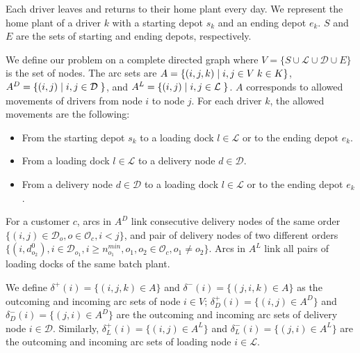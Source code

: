 Each driver leaves and returns to their home plant every day. We represent the home plant of a driver $k$ with a starting depot $s_k$ and an ending depot $e_k$. $S$ and $E$ are the sets of starting and ending depots, respectively.

We define our problem on a complete directed graph where $V=\{ S \cup \mathcal{L} \cup \mathcal{D} \cup E\}$ is the set of nodes. The arc sets are $A =  \{(i,j,k) \hspace*{1mm} \vert \hspace*{1mm} i, j \in V \hspace{1mm} k\in K \}$, $A^D = \{(i,j) \hspace*{1mm} \vert \hspace*{1mm} i, j \in \mathcal{D} \hspace{1mm} \}$, and $A^L = \{(i,j) \hspace*{1mm} \vert \hspace*{1mm} i, j \in \mathcal{L} \hspace{1mm} \}$.
$A$ corresponds to allowed movements of drivers from node $i$ to node $j$. For each driver $k$, the allowed movements are the following:

\begin{itemize}
    \item From the starting depot $s_k$ to a loading dock $l \in \mathcal{L}$ or to the ending depot $e_k$.
    \item From a loading dock $l \in \mathcal{L}$ to a delivery node $d \in \mathcal{D}$.
    \item From a delivery node  $d \in \mathcal{D}$ to a loading dock $l \in \mathcal{L}$ or to the ending depot $e_k$.
\end{itemize}

For a customer $c$, arcs in $A^D$ link consecutive delivery nodes of the same order   $\lbrace (i,j)\in \mathcal{D}_o, o \in \mathcal{O}_c, i < j  \rbrace$, and pair of delivery nodes of two different orders $ \lbrace (i,d^{0}_{o_2}),  i \in \mathcal{D}_{o_1}, i \geq n^{min}_{o_1}, o_1, o_2 \in \mathcal{O}_c, o_1 \neq o_2 \rbrace $. Arcs in $A^L$ link all pairs of loading docks of the same batch plant.

We define $\delta^{+}(i) = \{(i, j,k) \in A \}$ and $\delta^{-}(i) = \{(j, i,k) \in A \}$ as the outcoming and incoming arc sets of node $i \in V$; $\delta^{+}_D(i) = \{(i, j)  \in A^D\}$ and $\delta^{-}_D(i) = \{(j, i) \in A^D \}$ are the outcoming and incoming arc sets of delivery node $i \in \mathcal{D}$.  Similarly, $\delta^{+}_L(i) = \{(i, j)  \in A^L\}$ and $\delta^{-}_L(i) = \{(j, i) \in A^L \}$ are the outcoming and incoming arc sets of loading node $i \in \mathcal{L}$.

